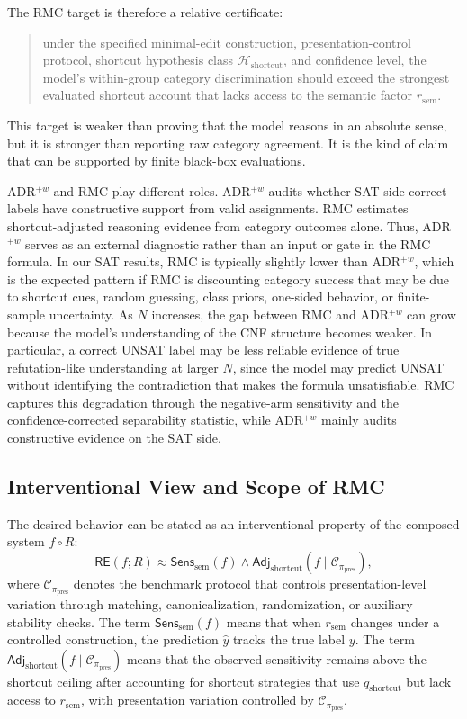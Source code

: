 \documentclass[conference]{IEEEtran}
\theoremstyle{remark}
\newcommand{\shortcutHypCls}{\mathcal{H}_{\mathrm{shortcut}}}
\newcommand{\reasonFac}{r_{\mathrm{sem}}}
\newcommand{\shortcutFac}{q_{\mathrm{shortcut}}}
\newcommand{\presentationFac}{\pi_{\mathrm{pres}}}
\begin{document}
The RMC target is therefore a relative certificate:
\begin{quote}
under the specified minimal-edit construction, presentation-control protocol, shortcut hypothesis class $\shortcutHypCls$, and confidence level, the model's within-group category discrimination should exceed the strongest evaluated shortcut account that lacks access to the semantic factor $\reasonFac$.
\end{quote}
This target is weaker than proving that the model reasons in an absolute sense, but it is stronger than reporting raw category agreement.  It is the kind of claim that can be supported by finite black-box evaluations.

ADR$^{+w}$ and RMC play different roles.  ADR$^{+w}$ audits whether SAT-side correct labels have constructive support from valid assignments.  RMC estimates shortcut-adjusted reasoning evidence from category outcomes alone.  Thus, ADR$^{+w}$ serves as an external diagnostic rather than an input or gate in the RMC formula.  In our SAT results, RMC is typically slightly lower than ADR$^{+w}$, which is the expected pattern if RMC is discounting category success that may be due to shortcut cues, random guessing, class priors, one-sided behavior, or finite-sample uncertainty.  As $N$ increases, the gap between RMC and ADR$^{+w}$ can grow because the model's understanding of the CNF structure becomes weaker.  In particular, a correct UNSAT label may be less reliable evidence of true refutation-like understanding at larger $N$, since the model may predict UNSAT without identifying the contradiction that makes the formula unsatisfiable.  RMC captures this degradation through the negative-arm sensitivity and the confidence-corrected separability statistic, while ADR$^{+w}$ mainly audits constructive evidence on the SAT side.

\subsection{Interventional View and Scope of RMC}
\label{sec:counterfactual-reasoning}

The desired behavior can be stated as an interventional property of the composed system $f\circ R$:
\begin{equation}\label{eq:formula-05}
\mathsf{RE}(f;R)
\approx
\mathsf{Sens}_{\mathrm{sem}}(f)
\wedge
\mathsf{Adj}_{\mathrm{shortcut}}(f \mid \mathcal{C}_{\presentationFac}),
\end{equation}
where $\mathcal{C}_{\presentationFac}$ denotes the benchmark protocol that controls presentation-level variation through matching, canonicalization, randomization, or auxiliary stability checks.  The term $\mathsf{Sens}_{\mathrm{sem}}(f)$ means that when $\reasonFac$ changes under a controlled construction, the prediction $\hat y$ tracks the true label $y$.  The term $\mathsf{Adj}_{\mathrm{shortcut}}(f \mid \mathcal{C}_{\presentationFac})$ means that the observed sensitivity remains above the shortcut ceiling after accounting for shortcut strategies that use $\shortcutFac$ but lack access to $\reasonFac$, with presentation variation controlled by $\mathcal{C}_{\presentationFac}$.
\end{document}
